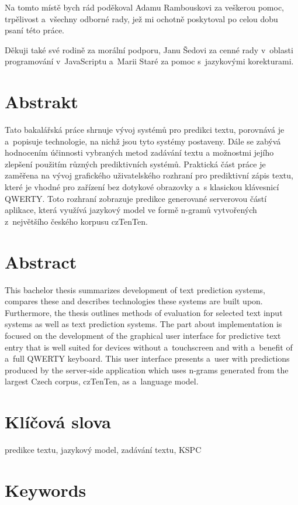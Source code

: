 \documentclass[a4paper,11pt,openany]{book} %
\begin{document}
Na tomto místě bych rád poděkoval Adamu Rambouskovi za veškerou pomoc, trpělivost a~všechny odborné rady, jež mi ochotně poskytoval po celou dobu psaní této práce. 

Děkuji také své rodině za morální podporu, Janu Šedovi za cenné rady v~oblasti programování v~JavaScriptu a~Marii Staré za pomoc s~jazykovými korekturami.

\clearpage

\section*{Abstrakt}

Tato bakalářská práce shrnuje vývoj systémů pro predikci textu, porovnává je a~popisuje technologie, na nichž jsou tyto systémy postaveny. Dále se zabývá hodnocením účinnosti vybraných metod zadávání textu a možnostmi jejího zlepšení použitím různých prediktivních systémů. Praktická část práce je zaměřena na vývoj grafického uživatelského rozhraní pro prediktivní zápis textu, které je vhodné pro zařízení bez dotykové obrazovky a~s klasickou klávesnicí QWERTY. Toto rozhraní zobrazuje predikce generované serverovou částí aplikace, která využívá jazykový model ve formě n-gramů vytvořených z~největšího českého korpusu czTenTen.

\section*{Abstract}

This bachelor thesis summarizes development of text prediction systems, compares these and describes technologies these systems are built upon. Furthermore, the thesis outlines methods of evaluation for selected text input systems as well as text prediction systems. The part about implementation is focused on the development of the graphical user interface for predictive text entry that is well suited for devices without a~touchscreen and with a~benefit of a~full QWERTY keyboard. This user interface presents a~user with predictions produced by the server-side application which uses n-grams generated from the largest Czech corpus, czTenTen, as a~language model.

\section*{Klíčová slova}

predikce textu, jazykový model, zadávání textu, KSPC

\section*{Keywords}
\end{document}
